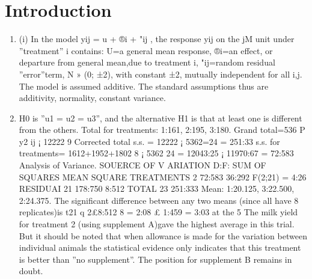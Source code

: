 \documentclass[a4paper,12pt]{article}
\begin{document}
\section{Introduction}
\begin{enumerate}
    \item (i) In the model yij = u + ®i + "ij , the response yij on the jM unit under ”treatment” i
contains:
U=a general mean response,
®i=an effect, or departure from general mean,due to treatment i,
"ij=random residual ”error”term, N » (0; ±2), with constant ±2, mutually independent
for all i,j.
The model is assumed additive. The standard assumptions thus are additivity, normality,
constant variance.
\item H0 is ”u1 = u2 = u3”, and the alternative H1 is that at least one is different from the
others.
Total for treatments: 1:161, 2:195, 3:180. Grand total=536
P
y2
ij ¡ 12222
9
Corrected total s.s. = 12222 ¡ 5362=24 = 251:33 s.s. for treatments= 1612+1952+1802
8 ¡
5362
24 = 12043:25 ¡ 11970:67 = 72:583
Analysis of Variance.
SOUERCE OF V ARIATION D:F: SUM OF SQUARES MEAN SQUARE
TREATMENTS 2 72:583 36:292 F(2;21) = 4:26
RESIDUAI 21 178:750 8:512
TOTAL 23 251:333
Mean: 1:20.125, 3:22.500, 2:24.375. The significant difference between any two means
(since all have 8 replicates)is t21
q
2£8:512
8 = 2:08 £ 1:459 = 3:03 at the 5%
The milk yield for treatment 2 (using supplement A)gave the highest average in this
trial. But it should be noted that when allowance is made for the variation between
individual animals the statistical evidence only indicates that this treatment is better
than ”no supplement”. The position for supplement B remains in doubt.
\end{enumerate}
\end{document}
